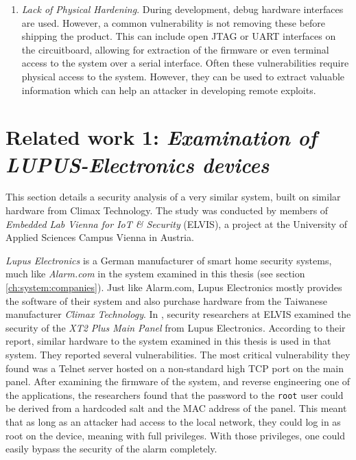 \begin{enumerate}
    \item \textit{Lack of Physical Hardening}. During development, debug hardware interfaces are used. However, a common vulnerability is not removing these before shipping the product. This can include open JTAG or UART interfaces on the circuitboard, allowing for extraction of the firmware or even terminal access to the system over a serial interface. Often these vulnerabilities require physical access to the system. However, they can be used to extract valuable information which can help an attacker in developing remote exploits.
\end{enumerate}

\section{Related work 1: \textit{Examination of LUPUS-Electronics devices}} \label{ch:related-work:lupus}
This section details a security analysis of a very similar system, built on similar hardware from Climax Technology. The study was conducted by members of \textit{Embedded Lab Vienna for IoT \& Security} (ELVIS), a project at the University of Applied Sciences Campus Vienna in Austria.

\textit{Lupus Electronics} is a German manufacturer of smart home security systems, much like \textit{Alarm.com} in the system examined in this thesis (see section \ref{ch:system:companies}). Just like Alarm.com, Lupus Electronics mostly provides the software of their system and also purchase hardware from the Taiwanese manufacturer \textit{Climax Technology}. In \citeyear{labvienna}, security researchers at ELVIS examined the security of the \textit{XT2 Plus Main Panel} from Lupus Electronics. According to their report, similar hardware to the system examined in this thesis is used in that system. They reported several vulnerabilities. The most critical vulnerability they found was a Telnet server hosted on a non-standard high TCP port on the main panel. After examining the firmware of the system, and reverse engineering one of the applications, the researchers found that the password to the \texttt{root} user could be derived from a hardcoded salt and the MAC address of the panel. This meant that as long as an attacker had access to the local network, they could log in as root on the device, meaning with full privileges. With those privileges, one could easily bypass the security of the alarm completely.

